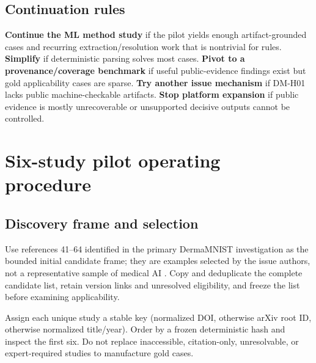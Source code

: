 \documentclass[11pt,a4paper]{article}
\begin{document}
\subsection{Continuation rules}
\textbf{Continue the ML method study} if the pilot yields enough artifact-grounded cases and recurring extraction/resolution work that is nontrivial for rules. \textbf{Simplify} if deterministic parsing solves most cases. \textbf{Pivot to a provenance/coverage benchmark} if useful public-evidence findings exist but gold applicability cases are sparse. \textbf{Try another issue mechanism} if DM-H01 lacks public machine-checkable artifacts. \textbf{Stop platform expansion} if public evidence is mostly unrecoverable or unsupported decisive outputs cannot be controlled.

\section{Six-study pilot operating procedure}
\label{sec:pilot}
\subsection{Discovery frame and selection}
Use references 41--64 identified in the primary DermaMNIST investigation as the bounded initial candidate frame; they are examples selected by the issue authors, not a representative sample of medical AI \cite{abhishek2025}. Copy and deduplicate the complete candidate list, retain version links and unresolved eligibility, and freeze the list before examining applicability.

Assign each unique study a stable key (normalized DOI, otherwise arXiv root ID, otherwise normalized title/year). Order by a frozen deterministic hash and inspect the first six. Do not replace inaccessible, citation-only, unresolvable, or expert-required studies to manufacture gold cases.
\end{document}
